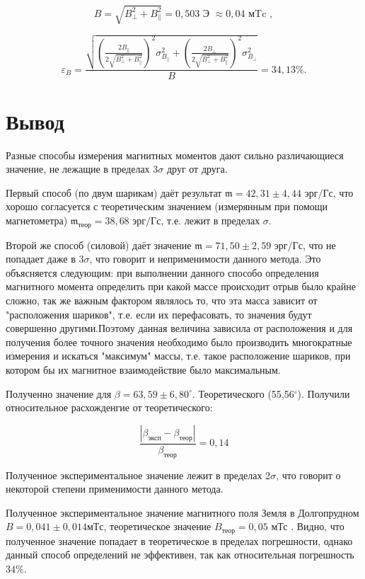 \documentclass[a4paper, 12pt]{article}%
\begin{document}
\[ B = \sqrt{B_{\perp}^2 + B_{\|}^2  } = 0,503 \text{ Э } \approx 0,04 \text{ мTc },\]

\[ \varepsilon_B = \frac{ \sqrt{ (\frac{2B_{\|}}{2\sqrt{B_{\perp}^2 + B_{\|}^2}})^2\sigma^2_{B_{\|}} + (\frac{2B_{\perp}}{2\sqrt{B_{\perp}^2 + B_{\|}^2}})^2\sigma^2_{B_{\perp}}  }  }{B}  = 34,13\% .\]

\section{Вывод}

Разные способы измерения магнитных моментов дают сильно различающиеся значение, не лежащие в пределах $3\sigma$ друг от друга.
 
Первый способ (по двум шарикам) даёт результат $\mathfrak{m} = 42,31 \pm 4,44 \text{ эрг/Гс}$, что хорошо согласуется с теоретическим значением (измерянным при помощи магнетометра) $\mathfrak{m}_{\text{теор}} = 38,68 \text{ эрг/Гс}$, т.е. лежит в пределах $\sigma$.
 
Второй же способ (силовой) даёт значение $\mathfrak{m} = 71,50 \pm 2,59 \text{ эрг/Гс}$, что не попадает даже в $3\sigma$, что говорит и неприменимости данного метода. Это объясняется следующим: при выполнении данного способо определения магнитного момента определить при какой массе происходит отрыв было крайне сложно, так же важным фактором являлось то, что эта масса зависит от "расположения шариков", т.е. если их перефасовать, то значения будут совершенно другими.Поэтому данная величина зависила от расположения и для получения более точного значения необходимо было производить многократные измерения и искаться "максимум" массы, т.е. такое расположение шариков, при котором бы их магнитное взаимодействие было максимальным. 


Полученно значение для $\beta = 63,59 \pm 6,80^{\circ}$. Теоретического (55,56$^{\circ}$). Получили относительное расхожденгие от теоретического:

\[ \frac{|\beta_{\text{эксп}} - \beta_{\text{теор}}|}{\beta_{\text{теор}}} =  0,14\]

Полученное экспериментальное значение лежит в пределах 2$\sigma$, что говорит о некоторой степени применимости данного метода.

Полученное экспериментальное значение магнитного поля Земля в Долгопрудном $B = 0,041 \pm 0,014{ мТс }$, теоретическое значение $B_{\text{теор}} = 0,05 \text{ мТс }$. Видно, что полученное значение попадает в теоретическое в пределах погрешности, однако данный способ определений не эффективен, так как относительная погрешность $34\%$.
 
\end{document}
